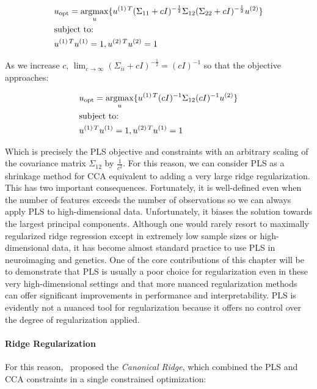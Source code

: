 \begin{align}\label{eq:cca}
     & u_{\text{opt}}=\underset{u}{\mathrm{argmax}}\{ u^{(1)\,T}(\Sigma_{11}+ c I)^{-\frac{1}{2}}\Sigma_{12}(\Sigma_{22}+c I)^{-\frac{1}{2}}u^{(2)} \} \\
     & \text{subject to:} \notag \\
     & u^{(1)\,T}u^{(1)}=1, u^{(2)\,T}u^{(2)}=1 \notag
\end{align}

As we increase $c$, $\lim_{c \to \infty} (\Sigma_{ii}+ c I)^{-\frac{1}{2}}= (c I)^{-1}$ so that the objective approaches:

\begin{align}
     & u_{\text{opt}}=\underset{u}{\mathrm{argmax}}\{ u^{(1)\,T}(c I)^{-1}\Sigma_{12}(c I)^{-1}u^{(2)} \} \\
        & \text{subject to:} \notag \\
        & u^{(1)\,T}u^{(1)}=1, u^{(2)\,T}u^{(1)}=1 \notag
\end{align}

Which is precisely the PLS objective and constraints with an arbitrary scaling of the covariance matrix $\Sigma_{12}$ by $\frac{1}{c^2}$.
For this reason, we can consider PLS as a shrinkage method for CCA equivalent to adding a very large ridge regularization.
This has two important consequences.
Fortunately, it is well-defined even when the number of features exceeds the number of observations so we can always apply PLS to high-dimensional data.
Unfortunately, it biases the solution towards the largest principal components.
Although one would rarely resort to maximally regularized ridge regression except in extremely low sample sizes or high-dimensional data, it has become almost standard practice to use PLS in neuroimaging and genetics.
One of the core contributions of this chapter will be to demonstrate that PLS is usually a poor choice for regularization even in these very high-dimensional settings and that more nuanced regularization methods can offer significant improvements in performance and interpretability.
PLS is evidently not a nuanced tool for regularization because it offers no control over the degree of regularization applied.

\paragraph{Ridge Regularization}

For this reason,~\citet{vinod1976canonical} proposed the \textit{Canonical Ridge}, which combined the PLS and CCA constraints in a single constrained optimization:

